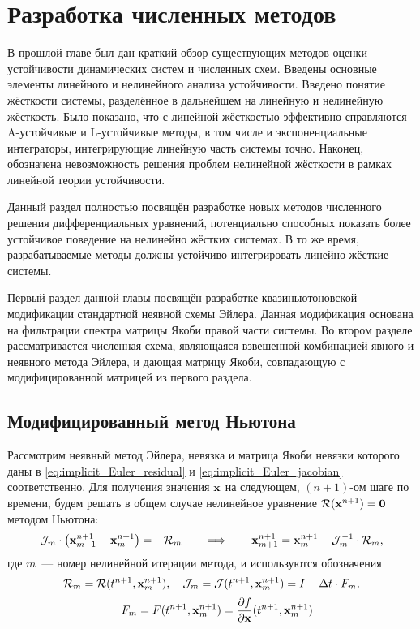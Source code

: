 \chapter{Разработка численных методов}
\label{chapter:methods} 

В прошлой главе был дан краткий обзор существующих методов оценки устойчивости динамических систем и численных схем.
Введены основные элементы линейного и нелинейного анализа устойчивости.
Введено понятие жёсткости системы, разделённое в дальнейшем на линейную и нелинейную жёсткость.
Было показано, что с линейной жёсткостью эффективно справляются A-устойчивые и L-устойчивые методы,
в том числе и экспоненциальные интеграторы, интегрирующие линейную часть системы точно.
Наконец, обозначена невозможность решения проблем нелинейной жёсткости в рамках линейной теории устойчивости.

Данный раздел полностью посвящён разработке новых методов численного решения дифференциальных уравнений,
потенциально способных показать более устойчивое поведение на нелинейно жёстких системах.
В то же время, разрабатываемые методы должны устойчиво интегрировать линейно жёсткие системы.

Первый раздел данной главы посвящён разработке квазиньютоновской модификации стандартной неявной схемы Эйлера.
Данная модификация основана на фильтрации спектра матрицы Якоби правой части системы.
Во втором разделе рассматривается численная схема, являющаяся взвешенной комбинацией явного и неявного метода Эйлера,
и дающая матрицу Якоби, совпадающую с модифицированной матрицей из первого раздела.



\section{Модифицированный метод Ньютона}
\label{sec:modified_Newton}

Рассмотрим неявный метод Эйлера, невязка и матрица Якоби невязки которого даны в \eqref{eq:implicit_Euler_residual} и \eqref{eq:implicit_Euler_jacobian} соответственно.
Для получения значения $ \mathbf{x} $ на следующем, $ (n + 1) $-ом шаге по времени,
будем решать в общем случае нелинейное уравнение $ \mathcal{R}(\mathbf{x}^{n+1}) = \mathbf{0} $ методом Ньютона:
%
\begin{equation}
    \label{eq:Newton_method}
    \mathcal{J}_m \cdot \left( \mathbf{x}_{m+1}^{n+1} - \mathbf{x}_m^{n+1} \right) = - \mathcal{R}_m
    \qquad \Longrightarrow \qquad
    \mathbf{x}_{m+1}^{n+1} = \mathbf{x}_m^{n+1} - \mathcal{J}_m^{-1} \cdot \mathcal{R}_m,
\end{equation}
%
где $ m $~--- номер нелинейной итерации метода, и используются обозначения
%
\begin{equation}
    \label{eq:Newton_method_defines}
    \mathcal{R}_m = \mathcal{R}(t^{n+1}, \mathbf{x}_m^{n+1}),
    \quad \mathcal{J}_m = \mathcal{J}(t^{n+1}, \mathbf{x}_m^{n+1}) = I - \Delta t \cdot F_m,
\end{equation}
\begin{equation}
    \label{eq:Newton_method_defines_2}
    \quad F_m = F(t^{n+1}, \mathbf{x}_m^{n+1}) = \frac{\partial f}{\partial \mathbf{x}}(t^{n+1}, \mathbf{x}_m^{n+1})
\end{equation}

